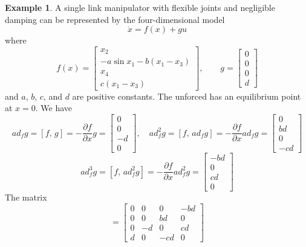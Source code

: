 \documentclass[11pt,a4paper,oneside]{book}
\numberwithin{equation}{section}
\theoremstyle{it}
\theoremstyle{definition}
\newtheorem{example}{Example}[section]
\begin{document}
\begin{example}
	A single link manipulator with flexible joints and negligible damping can be represented by the four-dimensional model
	\begin{equation*}
		\dot{x}=f(x)+gu
	\end{equation*}
	where 
	\begin{equation*}
		f(x)=\begin{bmatrix} x_2 \\[6pt] -a\sin x_1-b(x_1-x_3) \\[6pt] x_4 \\[6pt] c(x_1-x_3)
		\end{bmatrix}, \qquad 
			g=\begin{bmatrix} 0 \\[6pt] 0 \\[6pt] 0 \\[6pt] d
		\end{bmatrix}
	\end{equation*}
	and $a$, $b$, $c$, and $d$ are positive constants. The unforced has an equilibrium point at $x=0$. We have
	\begin{equation*}
		ad_fg=[f,\,g]=-\frac{\partial f}{\partial x}g=\begin{bmatrix} 0 \\[6pt] 0 \\[6pt] -d \\[6pt] 0 \end{bmatrix}, \quad
		ad_f^2g=[f,\,ad_fg]=-\frac{\partial f}{\partial x}ad_fg=\begin{bmatrix} 0 \\[6pt] bd \\[6pt] 0 \\[6pt] -cd \end{bmatrix}
	\end{equation*}
	\begin{equation*}
		ad_f^3g=[f,\,ad_f^2g]=-\frac{\partial f}{\partial x}ad_f^2g=\begin{bmatrix} -bd \\[6pt] 0 \\[6pt] cd \\[6pt] 0 \end{bmatrix}
	\end{equation*}
	The matrix
	\begin{equation*}
		[g,\,ad_fg,\,ad_f^2g,\,ad_f^3g] = \begin{bmatrix} 0&0&0&-bd \\[6pt] 0&0&bd&0 \\[6pt] 0&-d&0&cd \\[6pt] d&0&-cd&0 \end{bmatrix}

\end{equation*}
\end{example}
\end{document}
